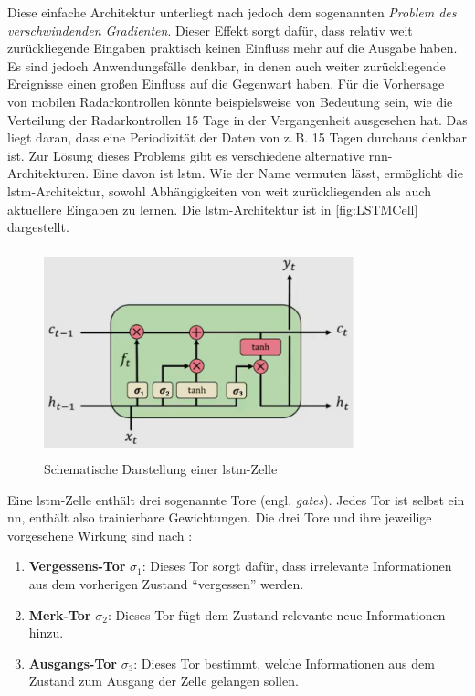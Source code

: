Diese einfache Architektur unterliegt nach \cite[S. 260]{DeepLearningPythonKeras} jedoch dem sogenannten \emph{Problem des verschwindenden Gradienten}.
Dieser Effekt sorgt dafür, dass relativ weit zurückliegende Eingaben praktisch keinen Einfluss mehr auf die Ausgabe haben.
Es sind jedoch Anwendungsfälle denkbar, in denen auch weiter zurückliegende Ereignisse einen großen Einfluss auf die Gegenwart haben.
Für die Vorhersage von mobilen Radarkontrollen könnte beispielsweise von Bedeutung sein, wie die Verteilung der Radarkontrollen 15 Tage in der Vergangenheit ausgesehen hat.
Das liegt daran, dass eine Periodizität der Daten von z.\,B. 15 Tagen durchaus denkbar ist.
Zur Lösung dieses Problems gibt es verschiedene alternative \acrshort{rnn}-Architekturen.
Eine davon ist \acrfull{lstm}.
Wie der Name vermuten lässt, ermöglicht die \acrshort{lstm}-Architektur, sowohl Abhängigkeiten von weit zurückliegenden als auch aktuellere Eingaben zu lernen.
Die \acrshort{lstm}-Architektur ist in \autoref{fig:LSTMCell} dargestellt.

\begin{figure}[h]
    \centering
    \includegraphics[width=0.8\textwidth,height=6cm,keepaspectratio=true]{content/images/LSTMCell.jpg}
    \caption{Schematische Darstellung einer \acrshort{lstm}-Zelle \cite{6S191RNN}}
    \label{fig:LSTMCell}
\end{figure}

Eine \acrshort{lstm}-Zelle enthält drei sogenannte Tore (engl. \emph{gates}).
Jedes Tor ist selbst ein \acrshort{nn}, enthält also trainierbare Gewichtungen.
Die drei Tore und ihre jeweilige vorgesehene Wirkung sind nach \cite{6S191RNN}:

\begin{minipage}{\linewidth}
\begin{enumerate}
    \setlength\itemsep{0.2em}
    \item \textbf{Vergessens-Tor} $\sigma_1$: Dieses Tor sorgt dafür, dass irrelevante Informationen aus dem vorherigen Zustand "`vergessen"' werden.
    \item \textbf{Merk-Tor} $\sigma_2$: Dieses Tor fügt dem Zustand relevante neue Informationen hinzu.
    \item \textbf{Ausgangs-Tor} $\sigma_3$: Dieses Tor bestimmt, welche Informationen aus dem Zustand zum Ausgang der Zelle gelangen sollen.
\end{enumerate}
\end{minipage}

